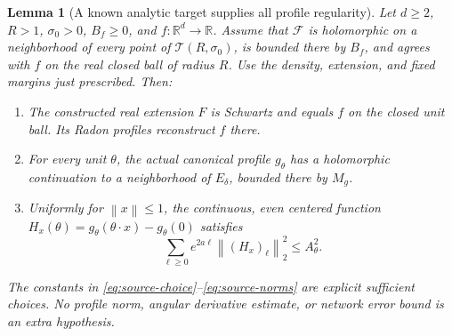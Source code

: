 \documentclass[11pt,letterpaper]{article}
\newcommand{\R}{\mathbb R}
\newcommand{\norm}[1]{\left\lVert#1\right\rVert}
\newtheorem{lemma}{Lemma}[section]
\theoremstyle{definition}
\theoremstyle{remark}
\begin{document}
\begin{lemma}[A known analytic target supplies all profile regularity]\label{thm:source}
Let \(d\ge2\), \(R>1\), \(\sigma_0>0\), \(B_f\ge0\), and
\(f:\R^d\to\R\). Assume that \(\mathcal F\) is holomorphic on a neighborhood
of every point of \(\mathcal T(R,\sigma_0)\), is bounded there by \(B_f\),
and agrees with \(f\) on the real closed ball of radius \(R\).
Use the density, extension, and fixed margins just prescribed.
Then:
\begin{enumerate}
\item The constructed real extension \(F\) is Schwartz and equals \(f\)
      on the closed unit ball. Its Radon profiles reconstruct \(f\) there.
\item For every unit \(\theta\), the actual canonical profile \(g_\theta\)
      has a holomorphic continuation to a neighborhood of \(E_\delta\),
      bounded there by \(M_g\).
\item Uniformly for \(\norm{x}\le1\), the continuous, even centered function
      \(H_x(\theta)=g_\theta(\theta\cdot x)-g_\theta(0)\) satisfies
\[
 \sum_{\ell\ge0}e^{2a\ell}\norm{(H_x)_\ell}_2^2\le A_\theta^2.
\]
\end{enumerate}
The constants in \eqref{eq:source-choice}--\eqref{eq:source-norms} are explicit
sufficient choices. No profile norm, angular derivative estimate, or network
error bound is an extra hypothesis.
\end{lemma}
\end{document}
